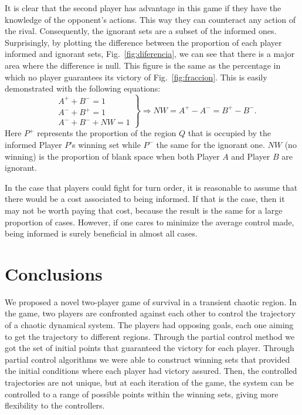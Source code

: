 It is clear that the second player has advantage in this game if they have the knowledge of the opponent's actions. This way they can counteract any action of the rival. Consequently, the ignorant sets are a subset of the informed ones. Surprisingly, by plotting the difference between the proportion of each player informed and ignorant sets, Fig.~\ref{fig:diferencia}, we can see that there is a major area where the difference is null. This figure is the same as the percentage in which no player guarantees its victory of Fig.~\ref{fig:fraccion}. This is easily demonstrated with the following equations:
\begin{equation}
   \left. \begin{array}{lll}
        &A^{+} + B^{-} = 1 \\
        &A^{-} + B^{+} = 1 \\
        &A^{-} + B^{-} + NW = 1
    \end{array}
    \right\} \Rightarrow NW = A^{+} - A^{-} = B^{+} - B^{-}.
\end{equation}
Here $P^{+}$ represents the proportion of the region $Q$ that is occupied by the informed Player $P$'s winning set while $P^{-}$ the same for the ignorant one. $ NW$ (no winning) is the proportion of blank space when both Player $A$ and Player $B$ are ignorant.

In the case that players could fight for turn order, it is reasonable to assume that there would be a cost associated to being informed. If that is the case, then it may not be worth paying that cost, because the result is the same for a large proportion of cases. However, if one cares to minimize the average control made, being informed is surely beneficial in almost all cases.






\section{Conclusions}

We proposed a novel two-player game of survival in a transient chaotic region. In the game, two players are confronted against each other to control the trajectory of a chaotic dynamical system. The players had opposing goals, each one aiming to get the trajectory to different regions. Through the partial control method we got the set of initial points that guaranteed the victory for each player. Through partial control algorithms we were able to construct winning sets that provided the initial conditions where each player had victory assured. Then, the controlled trajectories are not unique, but at each iteration of the game, the system can be controlled to a range of possible points within the winning sets, giving more flexibility to the controllers.

